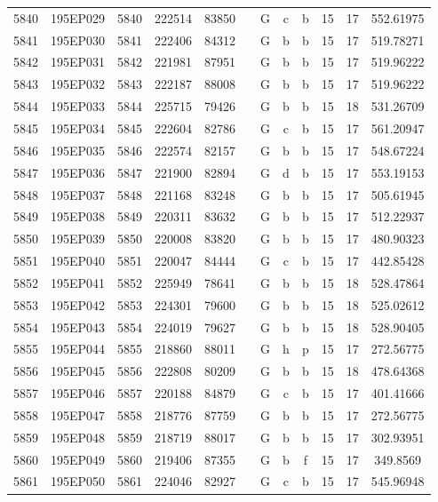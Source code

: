 \begin{tabular}{|*{12}{c|}}
5840 & 195EP029 & 5840 & 222514 & 83850 &  & G & c & b & 15 & 17 & 552.61975 \\ 
5841 & 195EP030 & 5841 & 222406 & 84312 &  & G & b & b & 15 & 17 & 519.78271 \\ 
5842 & 195EP031 & 5842 & 221981 & 87951 &  & G & b & b & 15 & 17 & 519.96222 \\ 
5843 & 195EP032 & 5843 & 222187 & 88008 &  & G & b & b & 15 & 17 & 519.96222 \\ 
5844 & 195EP033 & 5844 & 225715 & 79426 &  & G & b & b & 15 & 18 & 531.26709 \\ 
5845 & 195EP034 & 5845 & 222604 & 82786 &  & G & c & b & 15 & 17 & 561.20947 \\ 
5846 & 195EP035 & 5846 & 222574 & 82157 &  & G & b & b & 15 & 17 & 548.67224 \\ 
5847 & 195EP036 & 5847 & 221900 & 82894 &  & G & d & b & 15 & 17 & 553.19153 \\ 
5848 & 195EP037 & 5848 & 221168 & 83248 &  & G & b & b & 15 & 17 & 505.61945 \\ 
5849 & 195EP038 & 5849 & 220311 & 83632 &  & G & b & b & 15 & 17 & 512.22937 \\ 
5850 & 195EP039 & 5850 & 220008 & 83820 &  & G & b & b & 15 & 17 & 480.90323 \\ 
5851 & 195EP040 & 5851 & 220047 & 84444 &  & G & c & b & 15 & 17 & 442.85428 \\ 
5852 & 195EP041 & 5852 & 225949 & 78641 &  & G & b & b & 15 & 18 & 528.47864 \\ 
5853 & 195EP042 & 5853 & 224301 & 79600 &  & G & b & b & 15 & 18 & 525.02612 \\ 
5854 & 195EP043 & 5854 & 224019 & 79627 &  & G & b & b & 15 & 18 & 528.90405 \\ 
5855 & 195EP044 & 5855 & 218860 & 88011 &  & G & h & p & 15 & 17 & 272.56775 \\ 
5856 & 195EP045 & 5856 & 222808 & 80209 &  & G & b & b & 15 & 18 & 478.64368 \\ 
5857 & 195EP046 & 5857 & 220188 & 84879 &  & G & c & b & 15 & 17 & 401.41666 \\ 
5858 & 195EP047 & 5858 & 218776 & 87759 &  & G & b & b & 15 & 17 & 272.56775 \\ 
5859 & 195EP048 & 5859 & 218719 & 88017 &  & G & b & b & 15 & 17 & 302.93951 \\ 
5860 & 195EP049 & 5860 & 219406 & 87355 &  & G & b & f & 15 & 17 & 349.8569 \\ 
5861 & 195EP050 & 5861 & 224046 & 82927 &  & G & c & b & 15 & 17 & 545.96948 \\ 

\end{tabular}
